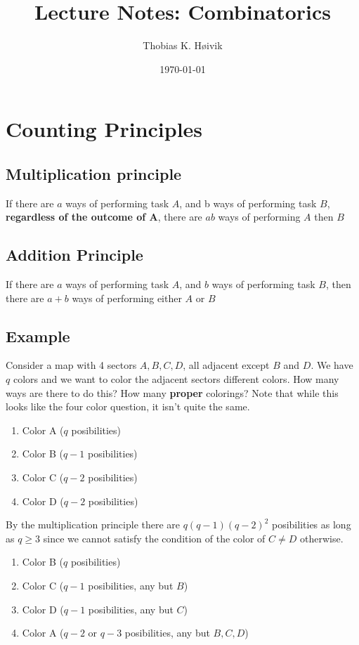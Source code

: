 \documentclass[12pt]{article}
\title{Lecture Notes: Combinatorics}
\author{Thobias K. Høivik}
\date{\today}
\begin{document}
\maketitle

\section{Counting Principles}
\subsection*{Multiplication principle}

If there are  $a$ ways of performing task $A$,
and b ways of performing task $B$,
\textbf{regardless of the outcome of A},
there are $ab$ ways of performing \(A\) then \(B\)

\subsection*{Addition Principle}
If there are \(a\) ways of performing task \(A\),
and \(b\) ways of performing task \(B\),
then there are \(a+b\) ways of performing either \(A\) or \(B\)

\subsection*{Example}
\noindent Consider a map with 4 sectors $A, B, C, D$, 
all adjacent except \(B\) and \(D\). 
We have \(q\) colors and we want to color the adjacent sectors
different colors.
How many ways are there to do this?
How many \textbf{proper} colorings?
Note that while this looks like the four color question, it isn't quite the same.

\begin{enumerate}
  \item Color A (\(q\) posibilities) 
  \item Color B (\(q - 1\) posibilities)
  \item Color C (\(q - 2\) posibilities)
  \item Color D (\(q - 2\) posibilities)
\end{enumerate}
By the multiplication principle there are 
\( 
  q(q-1)(q-2)^2
\) posibilities as long as \(q \ge 3\) since we cannot satisfy 
the condition of the color of \(C \neq D\) otherwise.

\begin{enumerate}
  \item Color B (\(q\) posibilities) 
  \item Color C (\(q - 1\) posibilities, any but \(B\))
  \item Color D (\(q - 1\) posibilities, any but \(C\))
  \item Color A (\(q - 2\) or \(q - 3\) posibilities, any but \(B,C,D\))
\end{enumerate}
\end{document}
